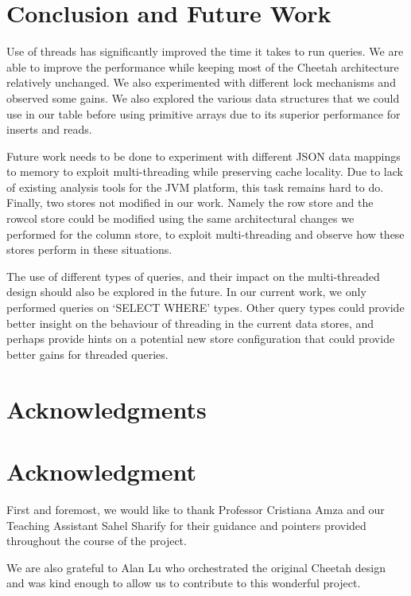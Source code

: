 \documentclass[11pt,journal,compsoc]{IEEEtran}
\begin{document}
\section{Conclusion and Future Work}
Use of threads has significantly improved the time it takes to run queries. We are able to improve the performance while keeping most of the Cheetah architecture relatively unchanged. We also experimented with different lock mechanisms and observed some gains. We also explored the various data structures that we could use in our table before using primitive arrays due to its superior performance for inserts and reads.

Future work needs to be done to experiment with different JSON data mappings to memory to exploit multi-threading while preserving cache locality. Due to lack of existing analysis tools for the JVM platform, this task remains hard to do. Finally, two stores not modified in our work. Namely the row store and the rowcol store could be modified using the same architectural changes we performed for the column store, to exploit multi-threading and observe how these stores perform in these situations.

The use of different types of queries, and their impact on the multi-threaded design should also be explored in the future. In our current work, we only performed queries on ‘SELECT WHERE’ types. Other query types could provide better insight on the behaviour of threading in the current data stores, and perhaps provide hints on a potential new store configuration that could provide better gains for threaded queries. 


\ifCLASSOPTIONcompsoc
  \section*{Acknowledgments}
\else
  \section*{Acknowledgment}
\fi

First and foremost, we would like to thank Professor Cristiana Amza and our Teaching Assistant Sahel Sharify for their guidance and pointers provided throughout the course of the project. 


We are also grateful to Alan Lu  who orchestrated the original Cheetah design and was kind enough to allow us to contribute to this wonderful project.
\end{document}
